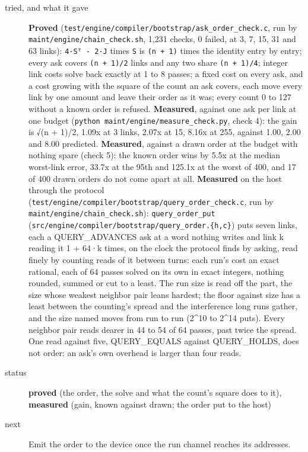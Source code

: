 \begin{description}
\item[{tried, and what it gave}] \textbf{Proved} (\texttt{test/\allowbreak{}engine/\allowbreak{}compiler/\allowbreak{}bootstrap/\allowbreak{}ask\_\allowbreak{}order\_\allowbreak{}check.\allowbreak{}c}, run by \texttt{maint/\allowbreak{}engine/\allowbreak{}chain\_\allowbreak{}check.\allowbreak{}sh}, 1,231 checks, 0 failed, at 3, 7, 15, 31 and 63 links): \texttt{4·Sᵀ -\allowbreak{} 2·J} times \texttt{S} is \texttt{(n + 1)} times the identity entry by entry; every ask covers \texttt{(n + 1)/\allowbreak{}2} links and any two share \texttt{(n + 1)/\allowbreak{}4}; integer link costs solve back exactly at 1 to 8 passes; a fixed cost on every ask, and a cost growing with the square of the count an ask covers, each move every link by one amount and leave their order as it was; every count 0 to 127 without a known order is refused. \textbf{Measured}, against one ask per link at one budget (\texttt{python maint/\allowbreak{}engine/\allowbreak{}measure\_\allowbreak{}check.\allowbreak{}py}, check 4): the gain is √(n + 1)/2, 1.09x at 3 links, 2.07x at 15, 8.16x at 255, against 1.00, 2.00 and 8.00 predicted. \textbf{Measured}, against a drawn order at the budget with nothing spare (check 5): the known order wins by 5.5x at the median worst-link error, 33.7x at the 95th and 125.1x at the worst of 400, and 17 of 400 drawn orders do not come apart at all. \textbf{Measured} on the host through the protocol (\texttt{test/\allowbreak{}engine/\allowbreak{}compiler/\allowbreak{}bootstrap/\allowbreak{}query\_\allowbreak{}order\_\allowbreak{}check.\allowbreak{}c}, run by \texttt{maint/\allowbreak{}engine/\allowbreak{}chain\_\allowbreak{}check.\allowbreak{}sh}): \texttt{query\_\allowbreak{}order\_\allowbreak{}put} (\texttt{src/\allowbreak{}engine/\allowbreak{}compiler/\allowbreak{}bootstrap/\allowbreak{}query\_\allowbreak{}order.\allowbreak{}\{h,c\}}) puts seven links, each a QUERY\_\allowbreak{}ADVANCES ask at a word nothing writes and link k reading it 1 + 64·k times, on the clock the protocol finds by asking, read finely by counting reads of it between turns: each run's cost an exact rational, each of 64 passes solved on its own in exact integers, nothing rounded, summed or cut to a least. The run size is read off the part, the size whose weakest neighbor pair leans hardest; the floor against size has a least between the counting's spread and the interference long runs gather, and the size named moves from run to run (2\textasciicircum{}10 to 2\textasciicircum{}14 puts). Every neighbor pair reads dearer in 44 to 54 of 64 passes, past twice the spread. One read against five, QUERY\_\allowbreak{}EQUALS against QUERY\_\allowbreak{}HOLDS, does not order: an ask's own overhead is larger than four reads.
\item[{status}] \textbf{proved} (the order, the solve and what the count's square does to it), \textbf{measured} (gain, known against drawn; the order put to the host)
\item[{next}] Emit the order to the device once the run channel reaches its addresses.
\end{description}

